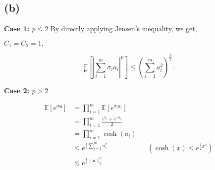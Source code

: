 \documentclass{article}
\begin{document}
\newpage

\subsection{(b)}


\textbf{Case 1: $p \leq 2$}
By directly applying Jensen's inequality, we get,

$C_1 = C_2 = 1,$

\begin{equation}
    \underset{\mathbf{\sigma}}{\mathbb{E}}\left[\left|\sum_{i=1}^{m} \sigma_{i} a_{i}\right|^{p}\right] \leq \left(\sum_{i=1}^{m} a_{i}^{2}\right)^{\frac{p}{2}}.
\end{equation}


\textbf{Case 2: $p > 2$}

\begin{align}
    \mathbb{E}\left[e^{\sigma \mathbf{a}}\right]
    &=\prod_{i=1}^{m} \mathbb{E}
        \left[
            e^{\sigma_i a_i}
        \right]\\
    &=\prod_{i=1}^{m} 
        \frac{e^{a_i}+e^{-a_i}}{2}\\
    &=\prod_{i=1}^{m} 
        \cosh 
            \left(
             a_i
            \right) \\
    &\leq
    e^{\frac{1}{2} \sum_{i=1}^{m}  a_{i}^{2}} && (\cosh (x) \leq e^{\frac{1}{2} x^{2}})\\ 
    &\leq
    e^{ \frac{1}{2} \|\bm{a}\|_{2}^{2} }
\end{align}
\end{document}
